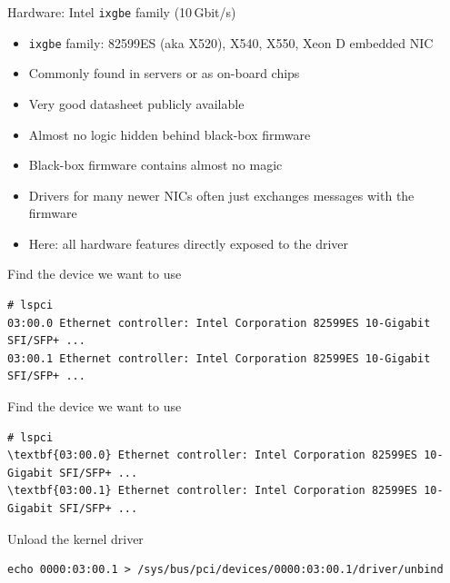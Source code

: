 \documentclass[NET,english,aspectratio=169,notitleframe]{tumbeamer}
\begin{document}
\begin{frame}{Hardware: Intel \texttt{ixgbe} family (10\,Gbit/s)}
\begin{itemize}
\item \texttt{ixgbe} family: 82599ES (aka X520), X540, X550, Xeon D embedded NIC
\item Commonly found in servers or as on-board chips
\item Very good datasheet publicly available
\vspace{1em}
\item Almost no logic hidden behind black-box firmware
\item<2-> Black-box firmware contains almost no magic
\item<2-> Drivers for many newer NICs often just exchanges messages with the firmware
\item<2-> Here: all hardware features directly exposed to the driver
\end{itemize}
\end{frame}




\begin{frame}[fragile=singleslide]{Find the device we want to use}
\begin{Verbatim}[commandchars=\\\{\}]
# lspci
03:00.0 Ethernet controller: Intel Corporation 82599ES 10-Gigabit SFI/SFP+ ...
03:00.1 Ethernet controller: Intel Corporation 82599ES 10-Gigabit SFI/SFP+ ...
\end{Verbatim}
\end{frame}

\begin{frame}[fragile=singleslide]{Find the device we want to use}
\begin{Verbatim}[commandchars=\\\{\}]
# lspci
\textbf{03:00.0} Ethernet controller: Intel Corporation 82599ES 10-Gigabit SFI/SFP+ ...
\textbf{03:00.1} Ethernet controller: Intel Corporation 82599ES 10-Gigabit SFI/SFP+ ...
\end{Verbatim}
\end{frame}

\begin{frame}[fragile=singleslide]{Unload the kernel driver}
\begin{verbatim}
echo 0000:03:00.1 > /sys/bus/pci/devices/0000:03:00.1/driver/unbind
\end{verbatim}
\end{frame}
\end{document}
